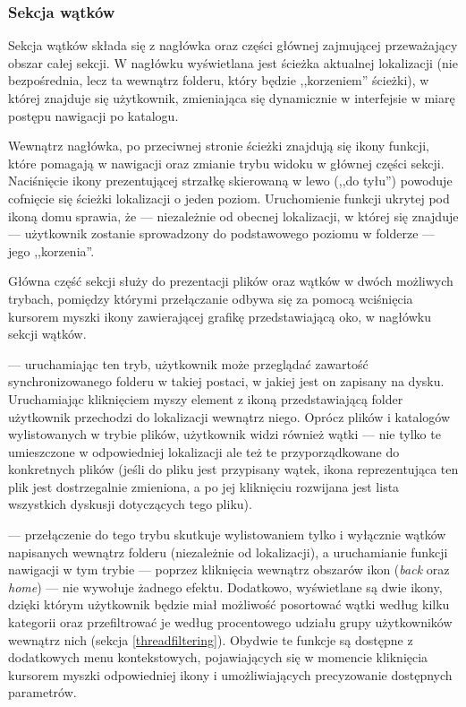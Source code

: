 \subsubsection*{Sekcja wątków}

Sekcja wątków składa się z nagłówka oraz części głównej zajmującej przeważający obszar całej sekcji. W nagłówku wyświetlana jest ścieżka aktualnej lokalizacji (nie bezpośrednia, lecz ta wewnątrz folderu, który będzie ,,korzeniem'' ścieżki), w której znajduje się użytkownik, zmieniająca się dynamicznie w interfejsie w miarę postępu nawigacji po katalogu.

Wewnątrz nagłówka, po przeciwnej stronie ścieżki znajdują się ikony funkcji, które pomagają w nawigacji oraz zmianie trybu widoku w głównej części sekcji. Naciśnięcie ikony prezentującej strzałkę skierowaną w lewo (,,do tyłu'') powoduje cofnięcie się ścieżki lokalizacji o jeden poziom. Uruchomienie funkcji ukrytej pod ikoną domu sprawia, że --- niezależnie od obecnej lokalizacji, w której się znajduje --- użytkownik zostanie sprowadzony do podstawowego poziomu w folderze --- jego ,,korzenia''.

Główna część sekcji służy do prezentacji plików oraz wątków w dwóch możliwych trybach, pomiędzy którymi przełączanie odbywa się za pomocą wciśnięcia kursorem myszki ikony zawierającej grafikę przedstawiającą oko, w nagłówku sekcji wątków.

\begin{description}[noitemsep]
  \item[Tryb plików] --- uruchamiając ten tryb, użytkownik może przeglądać zawartość synchronizowanego folderu w takiej postaci, w jakiej jest on zapisany na dysku. Uruchamiając kliknięciem myszy element z ikoną przedstawiającą folder użytkownik przechodzi do lokalizacji wewnątrz niego. Oprócz plików i katalogów wylistowanych w trybie plików, użytkownik widzi również wątki --- nie tylko te umieszczone w odpowiedniej lokalizacji ale też te przyporządkowane do konkretnych plików (jeśli do pliku jest przypisany wątek, ikona reprezentująca ten plik jest dostrzegalnie zmieniona, a po jej kliknięciu rozwijana jest lista wszystkich dyskusji dotyczących tego pliku).
  
  \item[Tryb wątków] --- przełączenie do tego trybu skutkuje wylistowaniem tylko i wyłącznie wątków napisanych wewnątrz folderu (niezależnie od lokalizacji), a uruchamianie funkcji nawigacji w tym trybie --- poprzez kliknięcia wewnątrz obszarów ikon (\emph{back} oraz \emph{home}) --- nie wywołuje żadnego efektu. Dodatkowo, wyświetlane są dwie ikony, dzięki którym użytkownik będzie miał możliwość posortować wątki według kilku kategorii oraz przefiltrować je według procentowego udziału grupy użytkowników wewnątrz nich (sekcja \ref{threadfiltering}). Obydwie te funkcje są dostępne z dodatkowych menu kontekstowych, pojawiających się w momencie kliknięcia kursorem myszki odpowiedniej ikony i umożliwiających precyzowanie dostępnych parametrów.
\end{description}


